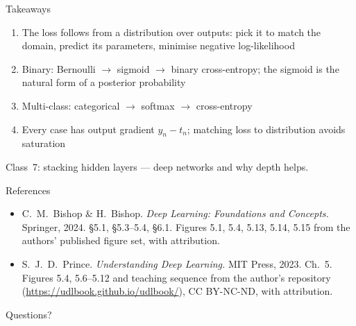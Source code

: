 \documentclass[aspectratio=169, 11pt]{beamer}
\newcommand{\nosrc}{}       %
\begin{document}
\begin{frame}{Takeaways}
  \nosrc
  \begin{enumerate}\setlength{\itemsep}{2pt}
    \item The loss follows from a \alert{distribution
          over outputs}: pick it to match the domain,
          predict its parameters, minimise negative
          log-likelihood
    \item Binary: Bernoulli $\to$ sigmoid $\to$ binary
          cross-entropy; the sigmoid is the natural form
          of a \alert{posterior probability}
    \item Multi-class: categorical $\to$ softmax $\to$
          cross-entropy
    \item Every case has output gradient
          \alert{$y_n-t_n$}; matching loss to
          distribution avoids saturation
  \end{enumerate}
  \vspace{0.3em}
  \begin{redhighlight}
    Class~7: stacking hidden layers ---
    \alert{deep networks} and why depth helps.
  \end{redhighlight}
\end{frame}

\begin{frame}{References}
  \nosrc
  \footnotesize
  \begin{itemize}
    \item C.~M.~Bishop \& H.~Bishop. \textit{Deep
          Learning: Foundations and Concepts.} Springer,
          2024. \S5.1, \S5.3--5.4, \S6.1. Figures 5.1,
          5.4, 5.13, 5.14, 5.15 from the authors'
          published figure set, with attribution.
    \item S.~J.~D.~Prince. \textit{Understanding Deep
          Learning.} MIT Press, 2023. Ch.~5. Figures 5.4,
          5.6--5.12 and teaching sequence from the
          author's repository
          (\url{https://udlbook.github.io/udlbook/}),
          CC BY-NC-ND, with attribution.
  \end{itemize}
\end{frame}

\begin{frame}[standout]
  \nosrc
  Questions?
\end{frame}
\end{document}
